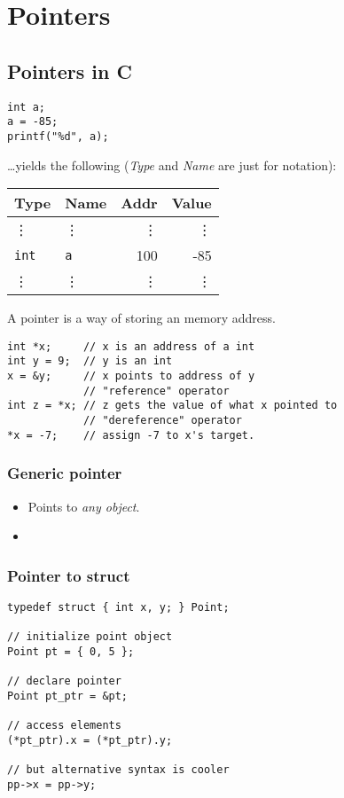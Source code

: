 \chapter{Pointers}
\section{Pointers in C}
\begin{verbatim}
int a;
a = -85;
printf("%d", a);
\end{verbatim}
\ldots yields the following (\emph{Type} and \emph{Name} are just for notation):

\noindent
\begin{tabular}{llrr}
	Type & Name & Addr & Value\\ \hline
	\vdots & \vdots & \vdots & \vdots \\
	\texttt{int} & \texttt{a} & 100 & -85 \\
	\vdots & \vdots & \vdots & \vdots \\
\end{tabular}

A pointer is a way of storing an memory address.

\begin{verbatim}
int *x;     // x is an address of a int
int y = 9;  // y is an int
x = &y;     // x points to address of y
            // "reference" operator
int z = *x; // z gets the value of what x pointed to
            // "dereference" operator
*x = -7;    // assign -7 to x's target.
\end{verbatim}

\subsection{Generic pointer}
\begin{itemize}
	\item Points to \emph{any object}.
	
	\item {}
\end{itemize}

\subsection{Pointer to struct}
\begin{verbatim}
typedef struct { int x, y; } Point;

// initialize point object
Point pt = { 0, 5 };

// declare pointer
Point pt_ptr = &pt;

// access elements
(*pt_ptr).x = (*pt_ptr).y;

// but alternative syntax is cooler
pp->x = pp->y;
\end{verbatim}

